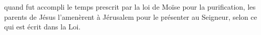 \encetemps
	quand fut accompli le temps prescrit par la loi de Moïse pour la purification,
	les parents de Jésus l’amenèrent à Jérusalem pour le présenter au Seigneur,
	selon ce qui est écrit dans la Loi.
